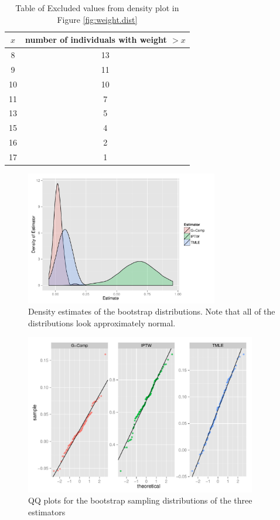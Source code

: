 \documentclass{article}
\begin{document}
\begin{table}
\centering
\begin{tabular}{c|c}
$x$ & number of individuals with weight $>x$ \\
\hline
8 & 13 \\
9 & 11 \\
10 & 10 \\
11 & 7 \\
13 & 5 \\
15 & 4 \\
16 & 2 \\
17 & 1
\end{tabular}
\caption{Table of Excluded values from density plot in Figure \ref{fig:weight.dist}}
\label{tab:missing.weights}
\end{table}

\begin{figure}
\centering
\includegraphics[width=0.75\textwidth]{figures/naiveBootstrapDensities.pdf}
\caption{Density estimates of the bootstrap distributions. Note that all of the distributions look approximately normal.}
\label{fig:boot.distr}
\end{figure}

\begin{figure}[hbp]
\centering
\includegraphics[width=0.9\textwidth]{figures/naiveBootstrapQQplots.pdf}
\caption{QQ plots for the bootstrap sampling distributions of the three estimators}
\label{fig:qqplot}
\end{figure}
\end{document}
